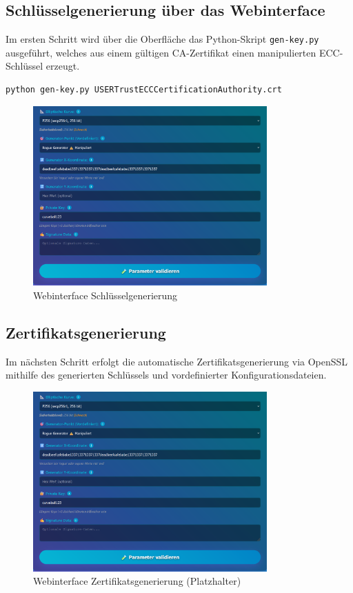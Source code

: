 \documentclass{article}
\begin{document}
\subsection{Schlüsselgenerierung über das Webinterface}
Im ersten Schritt wird über die Oberfläche das Python-Skript \texttt{gen-key.py} ausgeführt, welches aus einem gültigen CA-Zertifikat einen manipulierten ECC-Schlüssel erzeugt.

\begin{lstlisting}[language=bash,caption={Schlüsselgenerierung}]
python gen-key.py USERTrustECCCertificationAuthority.crt
\end{lstlisting}

\begin{figure}[h]
\centering
\includegraphics[width=0.8\textwidth]{webinterface_keygen.png}
\caption{Webinterface Schlüsselgenerierung}
\end{figure}

\subsection{Zertifikatsgenerierung}
Im nächsten Schritt erfolgt die automatische Zertifikatsgenerierung via OpenSSL mithilfe des generierten Schlüssels und vordefinierter Konfigurationsdateien.

\begin{figure}[h]
\centering
\includegraphics[width=0.8\textwidth]{webinterface_certgen.png}
\caption{Webinterface Zertifikatsgenerierung (Platzhalter)}
\end{figure}
\end{document}

